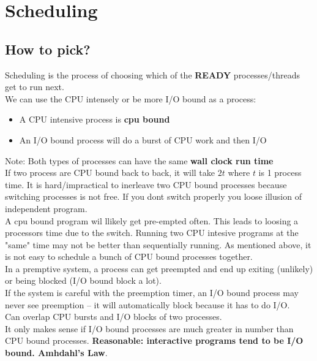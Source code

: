 \documentclass[../base_file/cs1550_notes.tex]{subfiles}
\begin{document}
\chapter{Scheduling}
\section{How to pick?}
Scheduling is the process of choosing which of the \textbf{READY}
processes/threads get to run next.\\

We can use the CPU intensely or be more I/O bound as a process:
	\begin{itemize}
	\item A CPU intensive process is \textbf{cpu bound}
	\item An I/O bound process will do a burst of CPU work and then
			I/O
	\end{itemize}
Note: Both types of processes can have the same \textbf{wall clock
run time}\\

If two process are CPU bound back to back, it will take $2t$ where
$t$ is 1 process time\@.  It is hard/impractical to inerleave two
CPU bound processes because switching processes is not free\@. If
you dont switch properly you loose illusion of independent program.\\

A cpu bound program wil llikely get pre-empted often.
This leads to loosing a processors time due to the switch.
Running two CPU intesive programs at the "same" time may not be better
than sequentially running.
As mentioned above, it is not easy to schedule a bunch of CPU bound
processes together.\\

In a premptive system, a process can get preempted and end up exiting
(unlikely) or being blocked (I/O bound block a lot).\\

If the system is careful with the preemption timer, an I/O bound process
may never see preemption -- it will automatically block because it
has to do I/O.\\

Can overlap CPU bursts and I/O blocks of two processes.\\
It only makes sense if I/O bound processes are much greater in number than
CPU bound processes.
\textbf{Reasonable: interactive programs tend to be I/O bound.  Amhdahl's Law}.\\
\end{document}

